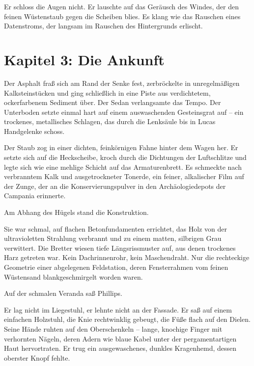 \documentclass[
  ngerman,
]{article}
\begin{document}
Er schloss die Augen nicht. Er lauschte auf das Geräusch des Windes, der
den feinen Wüstenstaub gegen die Scheiben blies. Es klang wie das
Rauschen eines Datenstroms, der langsam im Rauschen des Hintergrunds
erlischt.

\section{}\label{section}

\section{\texorpdfstring{\textbf{Kapitel 3: Die
Ankunft}}{Kapitel 3: Die Ankunft}}\label{kapitel-3-die-ankunft}

Der Asphalt fraß sich am Rand der Senke fest, zerbröckelte in
unregelmäßigen Kalksteinstücken und ging schließlich in eine Piste aus
verdichtetem, ockerfarbenem Sediment über. Der Sedan verlangsamte das
Tempo. Der Unterboden setzte einmal hart auf einem auswaschenden
Gesteinsgrat auf -- ein trockenes, metallisches Schlagen, das durch die
Lenksäule bis in Lucas Handgelenke schoss.

Der Staub zog in einer dichten, feinkörnigen Fahne hinter dem Wagen her.
Er setzte sich auf die Heckscheibe, kroch durch die Dichtungen der
Luftschlitze und legte sich wie eine mehlige Schicht auf das
Armaturenbrett. Es schmeckte nach verbranntem Kalk und ausgetrockneter
Tonerde, ein feiner, alkalischer Film auf der Zunge, der an die
Konservierungspulver in den Archäologiedepots der Campania erinnerte.

Am Abhang des Hügels stand die Konstruktion.

Sie war schmal, auf flachen Betonfundamenten errichtet, das Holz von der
ultravioletten Strahlung verbrannt und zu einem matten, silbrigen Grau
verwittert. Die Bretter wiesen tiefe Längsrissmuster auf, aus denen
trockenes Harz getreten war. Kein Dachrinnenrohr, kein Maschendraht. Nur
die rechteckige Geometrie einer abgelegenen Feldstation, deren
Fensterrahmen vom feinen Wüstensand blankgeschmirgelt worden waren.

Auf der schmalen Veranda saß Phillips.

Er lag nicht im Liegestuhl, er lehnte nicht an der Fassade. Er saß auf
einem einfachen Holzstuhl, die Knie rechtwinklig gebeugt, die Füße flach
auf den Dielen. Seine Hände ruhten auf den Oberschenkeln -- lange,
knochige Finger mit verhornten Nägeln, deren Adern wie blaue Kabel unter
der pergamentartigen Haut hervortraten. Er trug ein ausgewaschenes,
dunkles Kragenhemd, dessen oberster Knopf fehlte.
\end{document}
